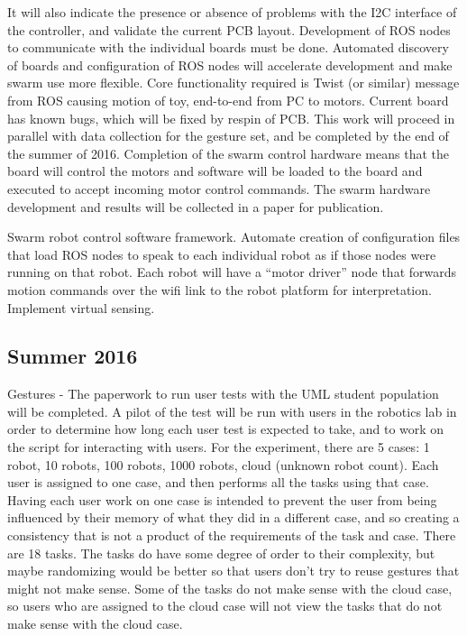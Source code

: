 \documentclass[]{article}
\begin{document}
It will also indicate the presence or absence of problems with the I2C interface of the controller, and validate the current PCB layout. 
Development of ROS nodes to communicate with the individual boards must be done. 
Automated discovery of boards and configuration of ROS nodes will accelerate development and make swarm use more flexible. 
Core functionality required is Twist (or similar) message from ROS causing motion of toy, end-to-end from PC to motors. 
Current board has known bugs, which will be fixed by respin of PCB. 
This work will proceed in parallel with data collection for the gesture set, and be completed by the end of the summer of 2016.
Completion of the swarm control hardware means that the board will control the motors and software will be loaded to the board and executed to accept incoming motor control commands.
The swarm hardware development and results will be collected in a paper for publication.  

Swarm robot control software framework. 
Automate creation of configuration files that load ROS nodes to speak to each individual robot as if those nodes were running on that robot. 
Each robot will have a ``motor driver'' node that forwards motion commands over the wifi link to the robot platform for interpretation. 
Implement virtual sensing. 

\subsection{Summer 2016}

Gestures - The paperwork to run user tests with the UML student population will be completed. 
A pilot of the test will be run with users in the robotics lab in order to determine how long each user test is expected to take, and to work on the script for interacting with users. 
For the experiment, there are 5 cases: 1 robot, 10 robots, 100 robots, 1000 robots, cloud (unknown robot count). 
Each user is assigned to one case, and then performs all the tasks using that case. 
Having each user work on one case is intended to prevent the user from being influenced by their memory of what they did in a different case, and so creating a consistency that is not a product of the requirements of the task and case. 
There are 18 tasks. 
The tasks do have some degree of order to their complexity, but maybe randomizing would be better so that users don't try to reuse gestures that might not make sense. 
Some of the tasks do not make sense with the cloud case, so users who are assigned to the cloud case will not view the tasks that do not make sense with the cloud case. 
\end{document}
